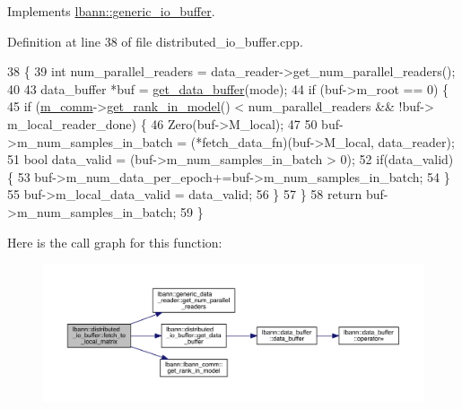 Implements \hyperlink{classlbann_1_1generic__io__buffer_af9fc2100d41328fe399acf7bced950d7}{lbann\+::generic\+\_\+io\+\_\+buffer}.



Definition at line 38 of file distributed\+\_\+io\+\_\+buffer.\+cpp.


\begin{DoxyCode}
38                                                                                                            
      \{
39   \textcolor{keywordtype}{int} num\_parallel\_readers = data\_reader->get\_num\_parallel\_readers();
40 
43   data\_buffer *buf = \hyperlink{classlbann_1_1distributed__io__buffer_ac176f3fced1191534a985f831136aa3e}{get\_data\_buffer}(mode);
44   \textcolor{keywordflow}{if} (buf->m\_root == 0) \{
45     \textcolor{keywordflow}{if} (\hyperlink{classlbann_1_1generic__io__buffer_a2e4a46c85c8b30e10b1cc5acaa2c4cca}{m\_comm}->\hyperlink{classlbann_1_1lbann__comm_a789453454468a3b70de768537c50ca52}{get\_rank\_in\_model}() < num\_parallel\_readers && !buf->
      m\_local\_reader\_done) \{
46       Zero(buf->M\_local);
47 
50       buf->m\_num\_samples\_in\_batch = (*fetch\_data\_fn)(buf->M\_local, data\_reader);
51       \textcolor{keywordtype}{bool} data\_valid = (buf->m\_num\_samples\_in\_batch > 0);
52       \textcolor{keywordflow}{if}(data\_valid) \{
53         buf->m\_num\_data\_per\_epoch+=buf->m\_num\_samples\_in\_batch;
54       \}
55       buf->m\_local\_data\_valid = data\_valid;
56     \}
57   \}
58   \textcolor{keywordflow}{return} buf->m\_num\_samples\_in\_batch;
59 \}
\end{DoxyCode}
Here is the call graph for this function\+:\nopagebreak
\begin{figure}[H]
\begin{center}
\leavevmode
\includegraphics[width=350pt]{classlbann_1_1distributed__io__buffer_abfeb87d4dc402b482db60926ca9b3ec1_cgraph}
\end{center}
\end{figure}
\mbox{\label{classlbann_1_1distributed__io__buffer_ac176f3fced1191534a985f831136aa3e}} 
